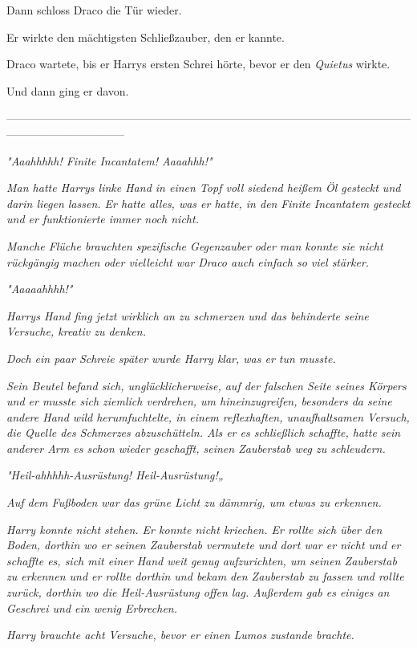 {Dann schloss Draco die Tür wieder.

Er wirkte den mächtigsten Schließzauber, den er kannte.

Draco wartete, bis er Harrys ersten Schrei hörte, bevor er den \emph{Quietus} wirkte.

Und dann ging er davon.

--------------------------------------------------------------------------------------------------------------------------------------------

\hfill\break \emph{"\emph{Aaahhhhh! Finite Incantatem! Aaaahhh!}"}

\emph{Man hatte Harrys linke Hand in einen Topf voll siedend heißem Öl gesteckt und darin liegen lassen. Er hatte alles, was er hatte, in den} \emph{\emph{Finite Incantatem}} \emph{gesteckt und er funktionierte immer noch nicht.}

\emph{Manche Flüche brauchten spezifische Gegenzauber oder man konnte sie nicht rückgängig machen oder vielleicht war Draco auch einfach so viel stärker.}

\emph{"\emph{Aaaaahhhh!}"}

\emph{Harrys Hand fing jetzt wirklich an zu schmerzen und das behinderte seine Versuche, kreativ zu denken.}

\emph{Doch ein paar Schreie später wurde Harry klar, was er tun musste.}

\emph{Sein Beutel befand sich, unglücklicherweise, auf der falschen Seite seines Körpers und er musste sich ziemlich verdrehen, um hineinzugreifen, besonders da seine andere Hand wild herumfuchtelte, in einem reflexhaften, unaufhaltsamen Versuch, die Quelle des Schmerzes abzuschütteln. Als er es schließlich schaffte, hatte sein anderer Arm es schon wieder geschafft, seinen Zauberstab weg zu schleudern.}

\emph{"Heil-\emph{ahhhhh}-Ausrüstung! Heil-Ausrüstung!„}

\emph{Auf dem Fußboden war das grüne Licht zu dämmrig, um etwas zu erkennen.}

\emph{Harry konnte nicht stehen. Er konnte nicht kriechen. Er rollte sich über den Boden, dorthin wo er seinen Zauberstab vermutete und dort war er nicht und er schaffte es, sich mit einer Hand weit genug aufzurichten, um seinen Zauberstab zu erkennen und er rollte dorthin und bekam den Zauberstab zu fassen und rollte zurück, dorthin wo die Heil-Ausrüstung offen lag. Außerdem gab es einiges an Geschrei und ein wenig Erbrechen.}

\emph{Harry brauchte acht Versuche, bevor er einen} \emph{\emph{Lumos}} \emph{zustande brachte.}

}
